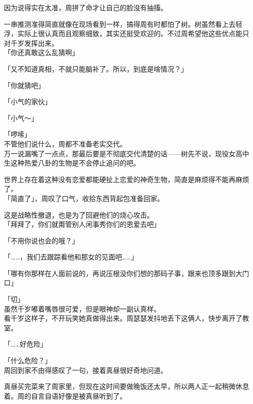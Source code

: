 因为说得实在太准，周拼了命才让自己的脸没有抽搐。

一串推测准得简直就像在现场看到一样，搞得周有时都怕了树。树虽然看上去轻浮，实际上很认真而且观察细致，其实还挺受欢迎的。不过周希望他这些优点能只对千岁发挥出来。\\

「你还真敢这么乱猜啊」

「又不知道真相，不就只能脑补了。所以，到底是啥情况？」

「你就猜吧」

「小气的家伙」

「小气～」

「啰嗦」\\

不管他们说什么，周都不准备老实交代。\\

万一说漏嘴了一点点，那最后要是不彻底交代清楚的话——树先不说，现役女高中生这种热爱八卦的生物是不会停止追问的吧。

世界上存在着这种没有恋爱都能硬扯上恋爱的神奇生物，简直是麻烦得不能再麻烦了。\\

「简直了」，周叹了口气，收拾东西背起包准备回家。

这是战略性撤退，也是为了回避他们的烧心攻击。\\

「拜拜了，你们就甭管别人闲事秀你们的恩爱去吧」

「不用你说也会的哦？」

「……，我们去跟踪看他和那女的见面吧……」

「哪有你那样在人面前说的，再说压根没你们想的那码子事，跟来也顶多跟到大门口」

「切」\\

虽然千岁嘟着嘴唇很可爱，但是眼神却一副认真样。\\

看千岁这样子，不开玩笑她真做得出来。周瑟瑟发抖地丢下这俩人，快步离开了教室。\\

\vspace{2\baselineskip}

「……好危险」

「什么危险？」\\

周回到家不由得感叹了一句，接着真昼很好奇地问道。

真昼买完菜来了周家里，但现在这时间要做晚饭还太早，所以两人正一起稍微休息着。周的自言自语好像是被真昼听到了。\\

